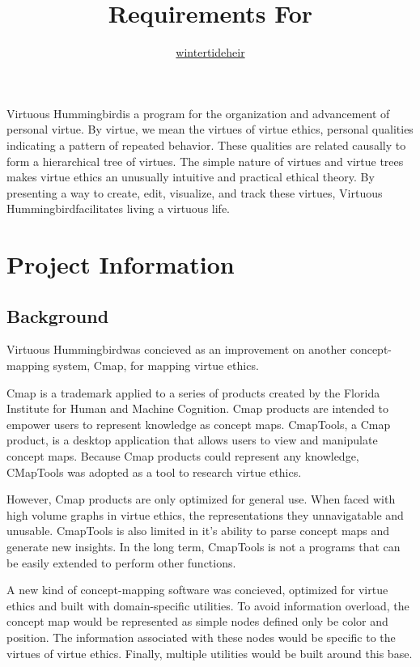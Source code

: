 \documentclass{article}
\title{Requirements For \name}
\author{\href{https://github.com/wintertideheir}{wintertideheir}}
\newcommand{\name}{Virtuous Hummingbird}
\begin{document}
\maketitle

\name is a program for the organization and advancement of personal virtue.
By virtue, we mean the virtues of virtue ethics, personal qualities indicating a pattern of repeated behavior.
These qualities are related causally to form a hierarchical tree of virtues. 
The simple nature of virtues and virtue trees makes virtue ethics an unusually intuitive and practical ethical theory.
By presenting a way to create, edit, visualize, and track these virtues, \name facilitates living a virtuous life.

\tableofcontents

\section{Project Information}

\subsection{Background}

\name was concieved as an improvement on another concept-mapping system, Cmap, for mapping virtue ethics.

Cmap is a trademark applied to a series of products created by the Florida Institute for Human and Machine Cognition.
Cmap products are intended to empower users to represent knowledge as concept maps.
CmapTools, a Cmap product, is a desktop application that allows users to view and manipulate concept maps.
Because Cmap products could represent any knowledge, CMapTools was adopted as a tool to research virtue ethics.

However, Cmap products are only optimized for general use.
When faced with high volume graphs in virtue ethics, the representations they unnavigatable and unusable.
CmapTools is also limited in it's ability to parse concept maps and generate new insights.
In the long term, CmapTools is not a programs that can be easily extended to perform other functions.

A new kind of concept-mapping software was concieved, optimized for virtue ethics and built with domain-specific utilities.
To avoid information overload, the concept map would be represented as simple nodes defined only be color and position.
The information associated with these nodes would be specific to the virtues of virtue ethics.
Finally, multiple utilities would be built around this base.
\end{document}
